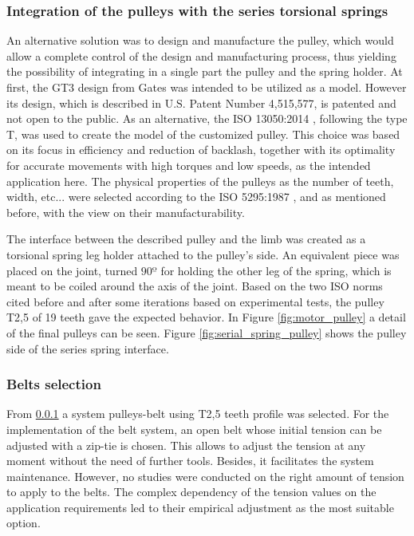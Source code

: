 \subsubsection{Integration of the pulleys with the series torsional springs} %
\label{ssub:integration_with_the_series_rotational}
An alternative solution was to design and manufacture the pulley, which would allow a complete control of the design and manufacturing process, thus yielding the possibility of integrating in a single part the pulley and the spring holder.
At first, the GT3 design from Gates was intended to be utilized as a model.
However its design, which is described in U.S. Patent Number 4,515,577, is patented and not open to the public.
As an alternative, the ISO 13050:2014 \cite{ISO13050}, following the type T, was used to create the model of the customized pulley.
This choice was based on its focus in efficiency and reduction of backlash, together with its optimality for accurate movements with high torques and low speeds, as the intended application here.
The physical properties of the pulleys as the number of teeth, width, etc... were selected according to the ISO 5295:1987 \cite{ISO5295}, and as mentioned before, with the view on their manufacturability.

The interface between the described pulley and the limb was created as a torsional spring leg holder attached to the pulley's side.
An equivalent piece was placed on the joint, turned $90º$ for holding the other leg of the spring, which is meant to be coiled around the axis of the joint.
Based on the two ISO norms cited before and after some iterations based on experimental tests, the pulley T2,5 of 19 teeth gave the expected behavior.
In Figure \ref{fig:motor_pulley} a detail of the final pulleys can be seen.
Figure \ref{fig:serial_spring_pulley} shows the pulley side of the series spring interface.

\subsubsection{Belts selection} %
\label{ssub:belts}
From \ref{ssub:integration_with_the_series_rotational} a system pulleys-belt using T2,5 teeth profile was selected.
For the implementation of the belt system, an open belt whose initial tension can be adjusted with a zip-tie is chosen.
This allows to adjust the tension at any moment without the need of further tools.
Besides, it facilitates the system maintenance.
However, no studies were conducted on the right amount of tension to apply to the belts. 
The complex dependency of the tension values on the application requirements led to their empirical adjustment as the most suitable option.

